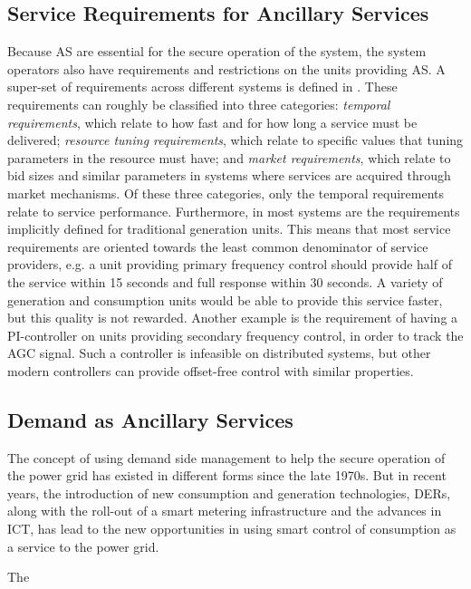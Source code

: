 \subsection{Service Requirements for Ancillary Services} %
\label{sub:servreqAS}
Because AS are essential for the secure operation of the system, the system operators also have requirements and restrictions on the units providing AS. A super-set of requirements across different systems is defined in . These requirements can roughly be classified into three categories: \emph{temporal requirements}, which relate to how fast and for how long a service must be delivered; \emph{resource tuning requirements}, which relate to specific values that tuning parameters in the resource must have; and \emph{market requirements}, which relate to bid sizes and similar parameters in systems where services are acquired through market mechanisms. Of these three categories, only the temporal requirements relate to service performance. Furthermore, in most systems are the requirements implicitly defined for traditional generation units. This means that most service requirements are oriented towards the least common denominator of service providers, e.g. a unit providing primary frequency control should provide half of the service within 15 seconds and full response within 30 seconds. A variety of generation and consumption units would be able to provide this service faster, but this quality is not rewarded. Another example is the requirement of having a PI-controller on units providing secondary frequency control, in order to track the AGC signal. Such a controller is infeasible on distributed systems, but other modern controllers can provide offset-free control with similar properties.
\subsection{Demand as Ancillary Services} %
\label{sub:demandAS}
The concept of using demand side management to help the secure operation of the power grid has existed in different forms since the late 1970s. But in recent years, the introduction of new consumption and generation technologies, \ie DERs, along with the roll-out of a smart metering infrastructure and the advances in ICT, has lead to the new opportunities in using smart control of consumption as a service to the power grid. 

The 
